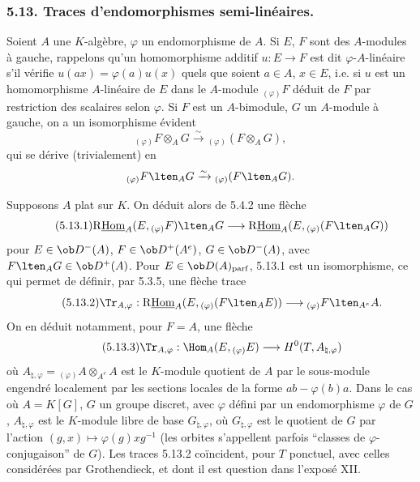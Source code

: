 \subsubsection*{5.13. Traces d'endomorphismes semi-linéaires.}

Soient $A$ une $K$-algèbre, $\varphi$ un endomorphisme de $A$. Si $E$, $F$ sont des $A$-modules à gauche, rappelons qu'un homomorphisme additif $u:E\to F$ est dit $\varphi$-$A$-linéaire s'il vérifie $u(ax)=\varphi(a)u(x)$ quels que soient $a\in A$, $x\in E$, i.e. si $u$ est un homomorphisme $A$-linéaire de $E$ dans le $A$-module ${}_{(\varphi)}F$ déduit de $F$ par restriction des scalaires selon $\varphi$. Si $F$ est un $A$-bimodule,
$G$ un $A$-module à gauche, on a un isomorphisme évident
\[
{}_{(\varphi)}F\otimes_AG\xrightarrow{\sim}{}_{(\varphi)}(F\otimes_AG),
\]
qui se dérive (trivialement) en
\[
{}_{(\varphi)}F\lten_AG\xrightarrow{\sim}{}_{(\varphi)}(F\lten_AG).
\]

Supposons $A$ plat sur $K$. On déduit alors de 5.4.2 une flèche
\begin{equation}\tag{5.13.1}
\mathrm{R}\underline{\mathrm{Hom}}_A(E,{}_{(\varphi)}F)\lten_AG\longrightarrow\mathrm{R}\underline{\mathrm{Hom}}_A(E,{}_{(\varphi)}(F\lten_AG))
\end{equation}
pour $E\in\ob D^-(A)$, $F\in\ob D^+(A^e)$, $G\in\ob D^-(A)$, avec $F\lten_AG\in\ob D^+(A)$. Pour $E\in\ob D(A)_{\mathrm{parf}}$, 5.13.1 est un isomorphisme, ce qui permet de définir, par 5.3.5, une flèche trace
\begin{equation}\tag{5.13.2}
\Tr_{A,\varphi}:\mathrm{R}\underline{\mathrm{Hom}}_A(E,{}_{(\varphi)}(F\lten_AE))\longrightarrow {}_{(\varphi)}F\lten_{A^e}A.
\end{equation}
On en déduit notamment, pour $F=A$, une flèche
\begin{equation}\tag{5.13.3}
\Tr_{A,\varphi}:\Hom_A(E,{}_{(\varphi)}E)\longrightarrow H^0(T,A_{\natural,\varphi})
\end{equation}
où $A_{\natural,\varphi}={}_{(\varphi)}A\otimes_{A^e}A$ est le $K$-module quotient de $A$ par le sous-module engendré localement par les sections locales de la forme $ab-\varphi(b)a$. Dans le cas où $A=K[G]$, $G$ un groupe discret, avec $\varphi$ défini par un endomorphisme $\varphi$ de $G$, $A_{\natural,\varphi}$ est le $K$-module libre de base $G_{\natural,\varphi}$, où $G_{\natural,\varphi}$ est le quotient de $G$ par l'action $(g,x)\mapsto\varphi(g)xg^{-1}$ (les orbites s'appellent parfois ``classes de $\varphi$-conjugaison'' de $G$). Les traces 5.13.2 coïncident, pour $T$ ponctuel, avec celles considérées par Grothendieck, et dont il est question dans l'exposé XII.

